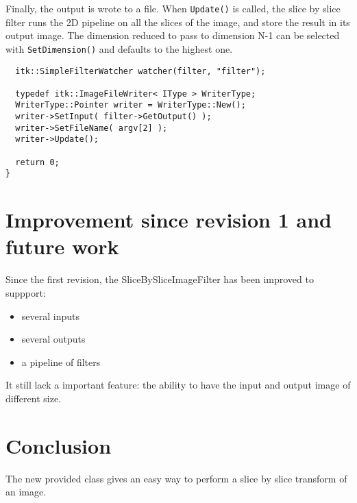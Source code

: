 \documentclass{InsightArticle}
\begin{document}
Finally, the output is wrote to a file. When \verb$Update()$ is called, the
slice by slice filter runs the 2D pipeline on all the slices of the image,
and store the result in its output image. The dimension reduced to pass to
dimension N-1 can be selected with \verb$SetDimension()$ and defaults to
the highest one.

\small \begin{verbatim}
  itk::SimpleFilterWatcher watcher(filter, "filter");

  typedef itk::ImageFileWriter< IType > WriterType;
  WriterType::Pointer writer = WriterType::New();
  writer->SetInput( filter->GetOutput() );
  writer->SetFileName( argv[2] );
  writer->Update();

  return 0;
}
\end{verbatim} \normalsize


\section{Improvement since revision 1 and future work}

Since the first revision, the SliceBySliceImageFilter has been improved to suppport:
\begin{itemize}
\item several inputs
\item several outputs
\item a pipeline of filters
\end{itemize}
It still lack a important feature: the ability to have the input and output image of different size.

\section{Conclusion}

The new provided class gives an easy way to perform a slice by slice transform of an image.









\appendix





\nocite{ITKSoftwareGuide}
\end{document}
